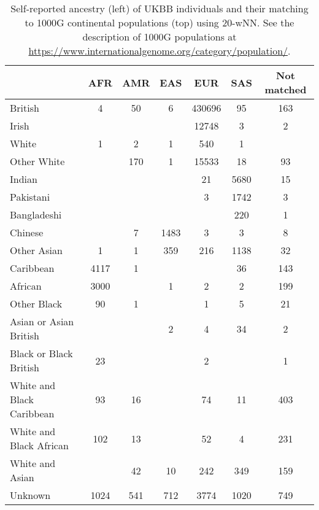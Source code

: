 \begin{table}[ht]
\centering
\caption{Self-reported ancestry (left) of UKBB individuals and their matching to 1000G continental populations (top) using 20-wNN. See the description of 1000G populations at \url{https://www.internationalgenome.org/category/population/}.} 
\label{tab:ancestry-pred-kNN}
\begin{tabular}{|l|c|c|c|c|c|c|}
  \hline
 & AFR & AMR & EAS & EUR & SAS & Not matched \\ 
  \hline
British & 4 & 50 & 6 & 430696 & 95 & 163 \\ 
  Irish &  &  &  & 12748 & 3 & 2 \\ 
  White & 1 & 2 & 1 & 540 & 1 &  \\ 
  Other White &  & 170 & 1 & 15533 & 18 & 93 \\ 
   \hline
Indian &  &  &  & 21 & 5680 & 15 \\ 
  Pakistani &  &  &  & 3 & 1742 & 3 \\ 
  Bangladeshi &  &  &  &  & 220 & 1 \\ 
  Chinese &  & 7 & 1483 & 3 & 3 & 8 \\ 
  Other Asian & 1 & 1 & 359 & 216 & 1138 & 32 \\ 
   \hline
Caribbean & 4117 & 1 &  &  & 36 & 143 \\ 
  African & 3000 &  & 1 & 2 & 2 & 199 \\ 
  Other Black & 90 & 1 &  & 1 & 5 & 21 \\ 
   \hline
Asian or Asian British &  &  & 2 & 4 & 34 & 2 \\ 
  Black or Black British & 23 &  &  & 2 &  & 1 \\ 
  White and Black Caribbean & 93 & 16 &  & 74 & 11 & 403 \\ 
  White and Black African & 102 & 13 &  & 52 & 4 & 231 \\ 
  White and Asian &  & 42 & 10 & 242 & 349 & 159 \\ 
   \hline
Unknown  & 1024 & 541 & 712 & 3774 & 1020 & 749 \\ 
   \hline
\end{tabular}
\end{table}
